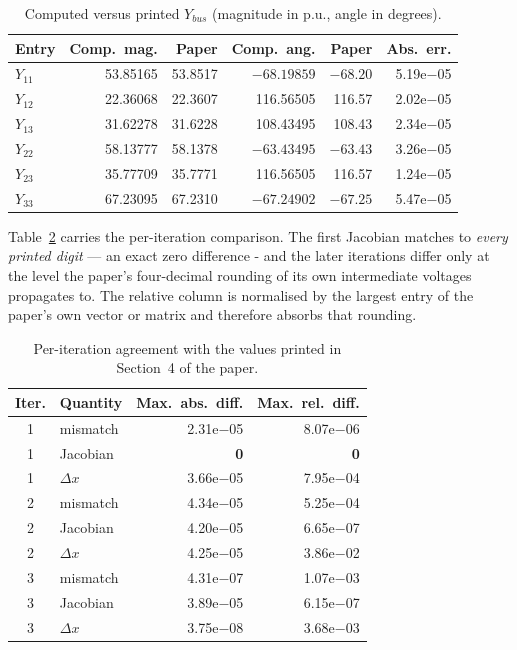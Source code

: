 \documentclass[sigconf,nonacm]{acmart}
\begin{document}
\begin{table}[t]
\centering
\caption{Computed versus printed $Y_{bus}$ (magnitude in p.u., angle in
degrees).}
\label{tab:ybus}
\footnotesize
\setlength{\tabcolsep}{3.5pt}
\begin{tabular}{l r r r r r}
\toprule
Entry & Comp.\ mag. & Paper & Comp.\ ang. & Paper & Abs.\ err. \\
\midrule
$Y_{11}$ & 53.85165 & 53.8517 & $-68.19859$ & $-68.20$ & 5.19e$-$05 \\
$Y_{12}$ & 22.36068 & 22.3607 & 116.56505 & 116.57 & 2.02e$-$05 \\
$Y_{13}$ & 31.62278 & 31.6228 & 108.43495 & 108.43 & 2.34e$-$05 \\
$Y_{22}$ & 58.13777 & 58.1378 & $-63.43495$ & $-63.43$ & 3.26e$-$05 \\
$Y_{23}$ & 35.77709 & 35.7771 & 116.56505 & 116.57 & 1.24e$-$05 \\
$Y_{33}$ & 67.23095 & 67.2310 & $-67.24902$ & $-67.25$ & 5.47e$-$05 \\
\bottomrule
\end{tabular}
\end{table}

Table~\ref{tab:iterations} carries the per-iteration comparison. The first
Jacobian matches to \emph{every printed digit} --- an exact zero difference -
and the later iterations differ only at the level the paper's four-decimal
rounding of its own intermediate voltages propagates to. The relative column is
normalised by the largest entry of the paper's own vector or matrix and
therefore absorbs that rounding.

\begin{table}[t]
\centering
\caption{Per-iteration agreement with the values printed in Section~4 of the
paper.}
\label{tab:iterations}
\small
\begin{tabular}{c l r r}
\toprule
Iter. & Quantity & Max.\ abs.\ diff. & Max.\ rel.\ diff. \\
\midrule
1 & mismatch     & 2.31e$-$05 & 8.07e$-$06 \\
1 & Jacobian     & \textbf{0}  & \textbf{0} \\
1 & $\Delta x$   & 3.66e$-$05 & 7.95e$-$04 \\
2 & mismatch     & 4.34e$-$05 & 5.25e$-$04 \\
2 & Jacobian     & 4.20e$-$05 & 6.65e$-$07 \\
2 & $\Delta x$   & 4.25e$-$05 & 3.86e$-$02 \\
3 & mismatch     & 4.31e$-$07 & 1.07e$-$03 \\
3 & Jacobian     & 3.89e$-$05 & 6.15e$-$07 \\
3 & $\Delta x$   & 3.75e$-$08 & 3.68e$-$03 \\
\bottomrule
\end{tabular}
\end{table}
\end{document}

